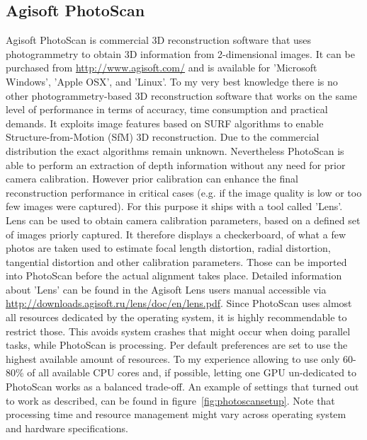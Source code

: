 \documentclass[12pt,a4paper]{scrartcl}
\begin{document}
\subsection{Agisoft PhotoScan}
Agisoft PhotoScan is commercial 3D reconstruction software that uses photogrammetry to obtain 3D information from 2-dimensional images. It can be purchased from \href{http://www.agisoft.com/}{http://www.agisoft.com/} and is available for 'Microsoft Windows', 'Apple OSX', and 'Linux'. To my very best knowledge there is no other photogrammetry-based 3D reconstruction software that works on the same level of performance in terms of accuracy, time consumption and practical demands. It exploits image features based on SURF algorithms to enable Structure-from-Motion (SfM) 3D reconstruction. Due to the commercial distribution the exact algorithms remain unknown.
Nevertheless PhotoScan is able to perform an extraction of depth information without any need for prior camera calibration. However prior calibration can enhance the final reconstruction performance in critical cases (e.g. if the image quality is low or too few images were captured). For this purpose it ships with a tool called 'Lens'. Lens can be used to obtain camera calibration parameters, based on a defined set of images priorly captured. It therefore displays a checkerboard, of what a few photos are taken used to estimate focal length distortion, radial distortion, tangential distortion and other calibration parameters. Those can be imported into PhotoScan before the actual alignment takes place. Detailed information about 'Lens' can be found in the Agisoft Lens users manual accessible via \href{http://downloads.agisoft.ru/lens/doc/en/lens.pdf}{http://downloads.agisoft.ru/lens/doc/en/lens.pdf}.
Since PhotoScan uses almost all resources dedicated by the operating system, it is highly recommendable to restrict those. This avoids system crashes that might occur when doing parallel tasks, while PhotoScan is processing. Per default preferences are set to use the highest available amount of resources. To my experience allowing to use only 60-80\% of all available CPU cores and, if possible, letting one GPU un-dedicated to PhotoScan works as a balanced trade-off. An example of settings that turned out to work as described, can be found in figure~\ref{fig:photoscansetup}. Note that processing time and resource management might vary across operating system and hardware specifications.
\end{document}
